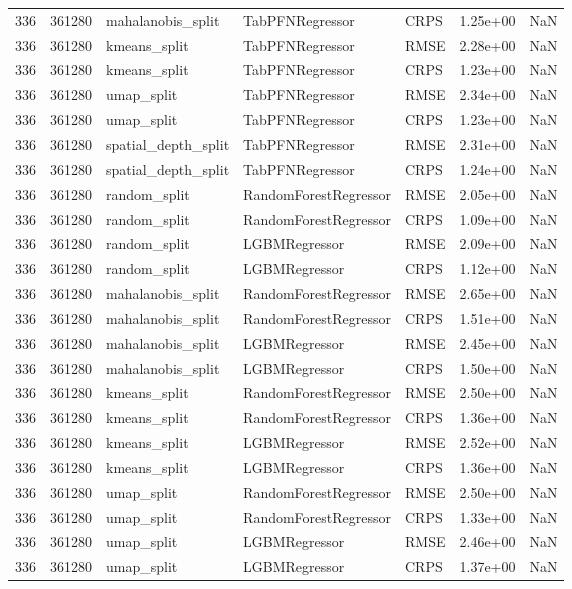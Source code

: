 \begin{tabular}{rrlllrr}
336 & 361280 & mahalanobis\_split & TabPFNRegressor & CRPS & 1.25e+00 & NaN \\
336 & 361280 & kmeans\_split & TabPFNRegressor & RMSE & 2.28e+00 & NaN \\
336 & 361280 & kmeans\_split & TabPFNRegressor & CRPS & 1.23e+00 & NaN \\
336 & 361280 & umap\_split & TabPFNRegressor & RMSE & 2.34e+00 & NaN \\
336 & 361280 & umap\_split & TabPFNRegressor & CRPS & 1.23e+00 & NaN \\
336 & 361280 & spatial\_depth\_split & TabPFNRegressor & RMSE & 2.31e+00 & NaN \\
336 & 361280 & spatial\_depth\_split & TabPFNRegressor & CRPS & 1.24e+00 & NaN \\
336 & 361280 & random\_split & RandomForestRegressor & RMSE & 2.05e+00 & NaN \\
336 & 361280 & random\_split & RandomForestRegressor & CRPS & 1.09e+00 & NaN \\
336 & 361280 & random\_split & LGBMRegressor & RMSE & 2.09e+00 & NaN \\
336 & 361280 & random\_split & LGBMRegressor & CRPS & 1.12e+00 & NaN \\
336 & 361280 & mahalanobis\_split & RandomForestRegressor & RMSE & 2.65e+00 & NaN \\
336 & 361280 & mahalanobis\_split & RandomForestRegressor & CRPS & 1.51e+00 & NaN \\
336 & 361280 & mahalanobis\_split & LGBMRegressor & RMSE & 2.45e+00 & NaN \\
336 & 361280 & mahalanobis\_split & LGBMRegressor & CRPS & 1.50e+00 & NaN \\
336 & 361280 & kmeans\_split & RandomForestRegressor & RMSE & 2.50e+00 & NaN \\
336 & 361280 & kmeans\_split & RandomForestRegressor & CRPS & 1.36e+00 & NaN \\
336 & 361280 & kmeans\_split & LGBMRegressor & RMSE & 2.52e+00 & NaN \\
336 & 361280 & kmeans\_split & LGBMRegressor & CRPS & 1.36e+00 & NaN \\
336 & 361280 & umap\_split & RandomForestRegressor & RMSE & 2.50e+00 & NaN \\
336 & 361280 & umap\_split & RandomForestRegressor & CRPS & 1.33e+00 & NaN \\
336 & 361280 & umap\_split & LGBMRegressor & RMSE & 2.46e+00 & NaN \\
336 & 361280 & umap\_split & LGBMRegressor & CRPS & 1.37e+00 & NaN \\

\end{tabular}
